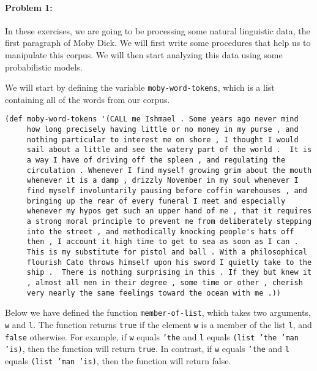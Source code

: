 \documentclass[12pt, letterpaper]{article}
\begin{document}
\pagestyle{fancy}
\paragraph{Problem 1:}

In these exercises, we are going to be processing some natural
linguistic data, the first paragraph of Moby Dick. We will first write
some procedures that help us to manipulate this corpus. We will then
start analyzing this data using some probabilistic models.

We will start by defining the variable \texttt{moby-word-tokens},
which is a list containing all of the words from our corpus.

\begin{lstlisting}
(def moby-word-tokens '(CALL me Ishmael . Some years ago never mind
     how long precisely having little or no money in my purse , and
     nothing particular to interest me on shore , I thought I would
     sail about a little and see the watery part of the world .  It is
     a way I have of driving off the spleen , and regulating the
     circulation . Whenever I find myself growing grim about the mouth
     whenever it is a damp , drizzly November in my soul whenever I
     find myself involuntarily pausing before coffin warehouses , and
     bringing up the rear of every funeral I meet and especially
     whenever my hypos get such an upper hand of me , that it requires
     a strong moral principle to prevent me from deliberately stepping
     into the street , and methodically knocking people's hats off
     then , I account it high time to get to sea as soon as I can .
     This is my substitute for pistol and ball . With a philosophical
     flourish Cato throws himself upon his sword I quietly take to the
     ship .  There is nothing surprising in this . If they but knew it
     , almost all men in their degree , some time or other , cherish
     very nearly the same feelings toward the ocean with me .))
\end{lstlisting}

Below we have defined the function \texttt{member-of-list}, which
takes two arguments, \texttt{w} and \texttt{l}. The function returns
\texttt{true} if the element \texttt{w} is a member of the list
\texttt{l}, and \texttt{false} otherwise. For example, if \texttt{w}
equals \texttt{'the} and \texttt{l} equals \texttt{(list 'the 'man
  'is)}, then the function will return \texttt{true}. In contrast, if
\texttt{w} equals \texttt{'the} and \texttt{l} equals \texttt{(list
  'man 'is)}, then the function will return false.
\end{document}
